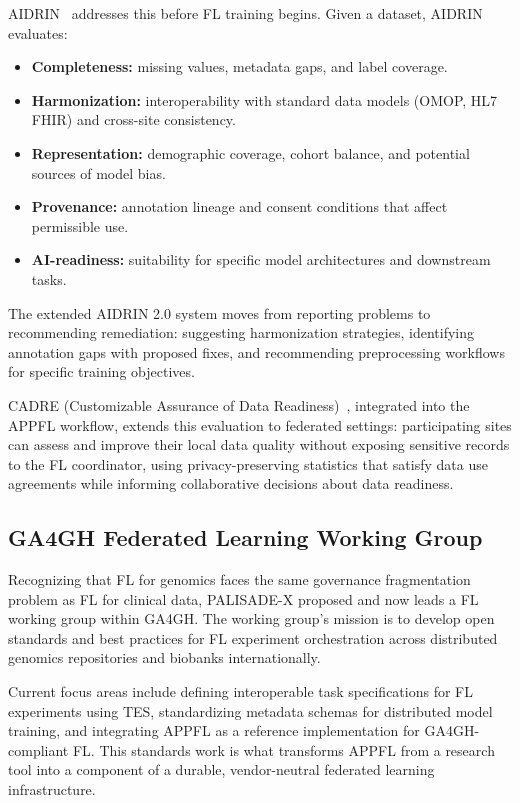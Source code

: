 \documentclass[conference]{IEEEtran}
\begin{document}
AIDRIN~\cite{hiniduma2024aidrin, hiniduma2025aidrin2} addresses this before FL training begins. Given a dataset, AIDRIN evaluates:
\begin{itemize}
    \item \textbf{Completeness:} missing values, metadata gaps, and label coverage.
    \item \textbf{Harmonization:} interoperability with standard data models (OMOP, HL7 FHIR) and cross-site consistency.
    \item \textbf{Representation:} demographic coverage, cohort balance, and potential sources of model bias.
    \item \textbf{Provenance:} annotation lineage and consent conditions that affect permissible use.
    \item \textbf{AI-readiness:} suitability for specific model architectures and downstream tasks.
\end{itemize}

The extended AIDRIN 2.0 system moves from reporting problems to recommending remediation: suggesting harmonization strategies, identifying annotation gaps with proposed fixes, and recommending preprocessing workflows for specific training objectives.

CADRE (Customizable Assurance of Data Readiness)~\cite{hiniduma2025cadre}, integrated into the APPFL workflow, extends this evaluation to federated settings: participating sites can assess and improve their local data quality without exposing sensitive records to the FL coordinator, using privacy-preserving statistics that satisfy data use agreements while informing collaborative decisions about data readiness.

\subsection{GA4GH Federated Learning Working Group}

Recognizing that FL for genomics faces the same governance fragmentation problem as FL for clinical data, PALISADE-X proposed and now leads a FL working group within GA4GH. The working group's mission is to develop open standards and best practices for FL experiment orchestration across distributed genomics repositories and biobanks internationally.

Current focus areas include defining interoperable task specifications for FL experiments using TES, standardizing metadata schemas for distributed model training, and integrating APPFL as a reference implementation for GA4GH-compliant FL. This standards work is what transforms APPFL from a research tool into a component of a durable, vendor-neutral federated learning infrastructure.
\end{document}
